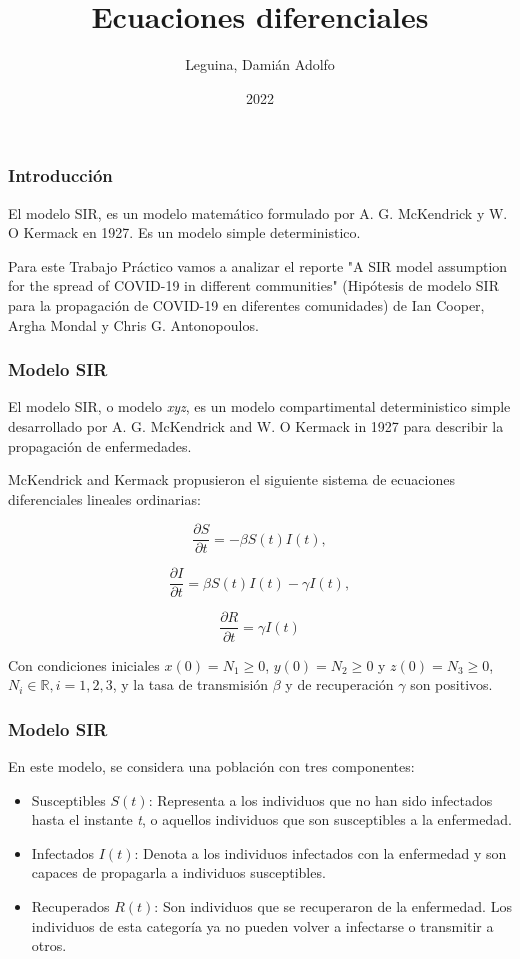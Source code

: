 \documentclass{beamer}
\title{Ecuaciones diferenciales}
\author{Leguina, Damián Adolfo}
\institute{UCEL – Universidad del Centro Educativo Latinoamericano}
\date{2022}
\begin{document}
\frame{\titlepage}

\begin{frame}
    \frametitle{Introducción}

    El modelo SIR, es un modelo matemático formulado por A. G. McKendrick y W. O Kermack en 1927. Es un modelo simple deterministico.

    Para este Trabajo Práctico vamos a analizar el reporte "A SIR model assumption for the spread of COVID-19 in different communities" (Hipótesis de modelo SIR para la propagación de COVID-19 en diferentes comunidades) de Ian Cooper, Argha Mondal y Chris G. Antonopoulos.

\end{frame}

\begin{frame}

    \frametitle{Modelo SIR}

    El modelo SIR, o modelo \emph{xyz}, es un modelo compartimental deterministico simple desarrollado por A. G. McKendrick and W. O
    Kermack in 1927 para describir la propagación de enfermedades.
    
    McKendrick and Kermack propusieron el siguiente sistema de ecuaciones diferenciales lineales ordinarias:

    \[
        \frac{\partial S}{\partial t}=-\beta S(t)I(t),
    \]

    \[
        \frac{\partial I}{\partial t}=\beta S(t)I(t)-\gamma I(t), 
    \]

    \[
        \frac{\partial R}{\partial t}=\gamma I(t)
    \]

    Con condiciones iniciales \( x(0)= N_1 \geq 0 \), \( y(0)= N_2 \geq 0 \) y \( z(0)= N_3 \geq 0 \), \(N_i \in \mathbb{R}, i = 1, 2 ,3 \), y la tasa de transmisión \(\beta\) y de recuperación \(\gamma\) son positivos.


\end{frame}

\begin{frame}
    \frametitle{Modelo SIR}

    En este modelo, se considera una población con tres componentes:

    \begin{itemize}
        \item Susceptibles \(S(t)\): Representa a los individuos que no han sido infectados hasta el instante \emph{t}, o aquellos individuos que son susceptibles a la enfermedad.
        \item Infectados \(I(t)\): Denota a los individuos infectados con la enfermedad y son capaces de propagarla a individuos susceptibles.
        \item Recuperados \(R(t)\): Son individuos que se recuperaron de la enfermedad. Los individuos de esta categoría ya no pueden volver a infectarse o transmitir a otros.
    \end{itemize}
\end{frame}
\end{document}

